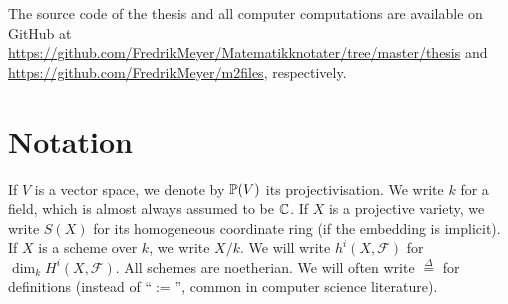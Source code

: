The source code of the thesis and all computer computations are available on GitHub at \url{https://github.com/FredrikMeyer/Matematikknotater/tree/master/thesis} and \url{https://github.com/FredrikMeyer/m2files}, respectively.



\section{Notation}

If $V$ is a vector space, we denote by $\P(V)$ its projectivisation. We write $k$ for a field, which is almost always assumed to be $\C$. If $X$ is a projective variety, we write $S(X)$ for its homogeneous coordinate ring (if the embedding is implicit). If $X$ is a scheme over $k$, we write $X/k$. We will write $h^i(X,\mathscr F)$ for $\dim_k H^i(X,\mathscr F)$. All schemes are noetherian. We will often write $\stackrel \Delta = $ for definitions (instead of  ``$:=$'', common in computer science literature).